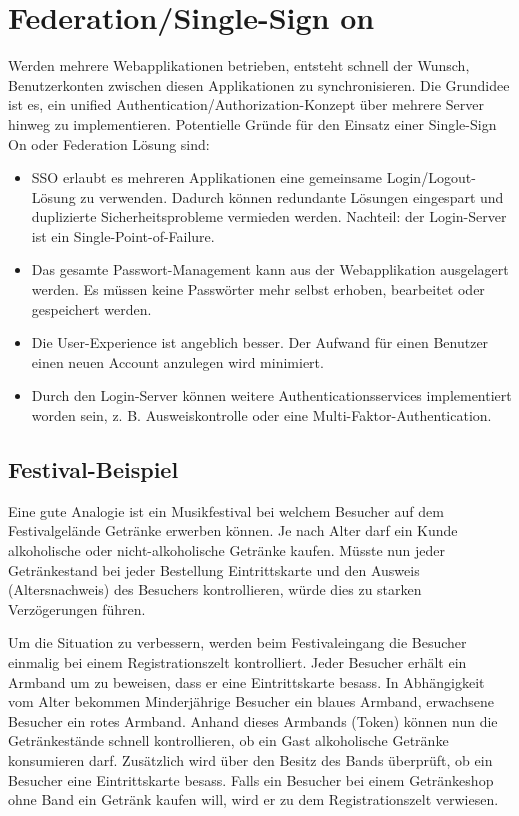 \chapter{Federation/Single-Sign on}

Werden mehrere Webapplikationen betrieben, entsteht schnell der Wunsch, Benutzerkonten zwischen diesen Applikationen zu synchronisieren. Die Grundidee ist es, ein unified Authentication/Authorization-Konzept über mehrere Server hinweg zu implementieren. Potentielle Gründe für den Einsatz einer Single-Sign On oder Federation Lösung sind:

\begin{itemize}
	\item SSO erlaubt es mehreren Applikationen eine gemeinsame Login/Logout-Lösung zu verwenden. Dadurch können redundante Lösungen eingespart und duplizierte Sicherheitsprobleme vermieden werden. Nachteil: der Login-Server ist ein Single-Point-of-Failure.
	\item Das gesamte Passwort-Management kann aus der Webapplikation ausgelagert werden. Es müssen keine Passwörter mehr selbst erhoben, bearbeitet oder gespeichert werden.
	\item Die User-Experience ist angeblich besser. Der Aufwand für einen Benutzer einen neuen Account anzulegen wird minimiert.
	\item Durch den Login-Server können weitere Authenticationsservices implementiert worden sein, z. B. Ausweiskontrolle oder eine Multi-Faktor-Authentication.
\end{itemize}

\section{Festival-Beispiel}

Eine gute Analogie ist ein Musikfestival bei welchem Besucher auf dem Festivalgelände Getränke erwerben können. Je nach Alter darf ein Kunde alkoholische oder nicht-alkoholische Getränke kaufen. Müsste nun jeder Getränkestand bei jeder Bestellung Eintrittskarte und den Ausweis (Altersnachweis) des Besuchers kontrollieren, würde dies zu starken Verzögerungen führen.

Um die Situation zu verbessern, werden beim Festivaleingang die Besucher einmalig bei einem Registrationszelt kontrolliert. Jeder Besucher erhält ein Armband um zu beweisen, dass er eine Eintrittskarte besass. In Abhängigkeit vom Alter bekommen Minderjährige Besucher ein blaues Armband, erwachsene Besucher ein rotes Armband. Anhand dieses Armbands (Token) können nun die Getränkestände schnell kontrollieren, ob ein Gast alkoholische Getränke konsumieren darf. Zusätzlich wird über den Besitz des Bands überprüft, ob ein Besucher eine Eintrittskarte besass. Falls ein Besucher bei einem Getränkeshop ohne Band ein Getränk kaufen will, wird er zu dem Registrationszelt  verwiesen.

